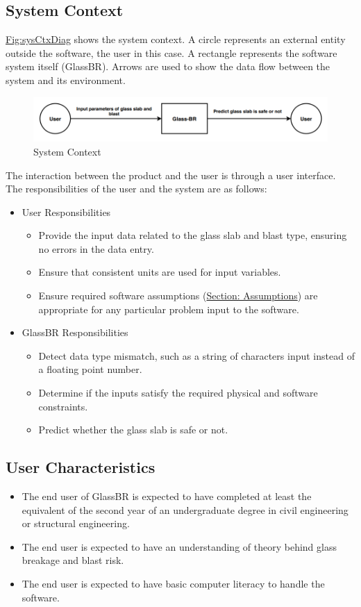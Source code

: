 \documentclass[12pt]{article}
\begin{document}
\subsection{System Context}
\label{Sec:SysContext}
\hyperref[Figure:sysCtxDiag]{Fig:sysCtxDiag} shows the system context. A circle represents an external entity outside the software, the user in this case. A rectangle represents the software system itself (GlassBR). Arrows are used to show the data flow between the system and its environment.
\begin{figure}
\begin{center}
\includegraphics[width=\textwidth]{../../../datafiles/GlassBR/SystemContextFigure.png}
\caption{System Context}
\label{Figure:sysCtxDiag}
\end{center}
\end{figure}
The interaction between the product and the user is through a user interface. The responsibilities of the user and the system are as follows:
\begin{itemize}
\item{User Responsibilities}
\begin{itemize}
\item{Provide the input data related to the glass slab and blast type, ensuring no errors in the data entry.}
\item{Ensure that consistent units are used for input variables.}
\item{Ensure required software assumptions (\hyperref[Sec:Assumps]{Section: Assumptions}) are appropriate for any particular problem input to the software.}
\end{itemize}
\item{GlassBR Responsibilities}
\begin{itemize}
\item{Detect data type mismatch, such as a string of characters input instead of a floating point number.}
\item{Determine if the inputs satisfy the required physical and software constraints.}
\item{Predict whether the glass slab is safe or not.}
\end{itemize}
\end{itemize}
\subsection{User Characteristics}
\label{Sec:UserChars}
\begin{itemize}
\item{The end user of GlassBR is expected to have completed at least the equivalent of the second year of an undergraduate degree in civil engineering or structural engineering.}
\item{The end user is expected to have an understanding of theory behind glass breakage and blast risk.}
\item{The end user is expected to have basic computer literacy to handle the software.}
\end{itemize}
\end{document}

